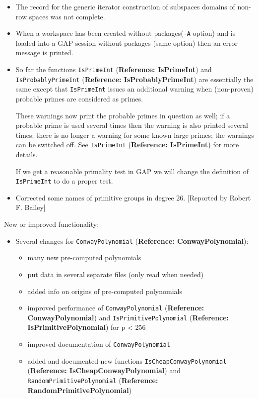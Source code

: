 \documentclass[a4paper,11pt]{report}
\begin{document}
{{\begin{itemize}
if the list typing code tried to mark it homogenous, since the code intended
to catch such errors also had a bug. [Reported by Steve Linton] 
\item  The record for the generic iterator construction of subspaces domains of
non-row spaces was not complete. 
\item  When a workspace has been created without packages(\texttt{-A} option) and is loaded into a \textsf{GAP} session without packages (same option) then an error message is printed. 
\item  So far the functions \texttt{IsPrimeInt} (\textbf{Reference: IsPrimeInt}) and \texttt{IsProbablyPrimeInt} (\textbf{Reference: IsProbablyPrimeInt}) are essentially the same except that \texttt{IsPrimeInt} issues an additional warning when (non-proven) probable primes are considered
as primes. 

 These warnings now print the probable primes in question as well; if a
probable prime is used several times then the warning is also printed several
times; there is no longer a warning for some known large primes; the warnings
can be switched off. See \texttt{IsPrimeInt} (\textbf{Reference: IsPrimeInt}) for more details. 

 If we get a reasonable primality test in \textsf{GAP} we will change the definition of \texttt{IsPrimeInt} to do a proper test. 
\item  Corrected some names of primitive groups in degree 26. [Reported by Robert F.
Bailey] 
\end{itemize}
 New or improved functionality: 
\begin{itemize}
\item  Several changes for \texttt{ConwayPolynomial} (\textbf{Reference: ConwayPolynomial}): 
\begin{itemize}
\item  many new pre-computed polynomials 
\item  put data in several separate files (only read when needed) 
\item  added info on origins of pre-computed polynomials 
\item  improved performance of \texttt{ConwayPolynomial} (\textbf{Reference: ConwayPolynomial}) and \texttt{IsPrimitivePolynomial} (\textbf{Reference: IsPrimitivePolynomial}) for p {\textless} 256 
\item  improved documentation of \texttt{ConwayPolynomial} 
\item  added and documented new functions \texttt{IsCheapConwayPolynomial} (\textbf{Reference: IsCheapConwayPolynomial}) and \texttt{RandomPrimitivePolynomial} (\textbf{Reference: RandomPrimitivePolynomial}) 
\end{itemize}
 

\end{itemize}}}
\end{document}
